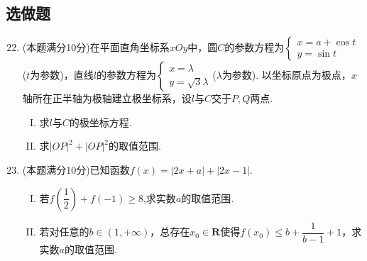 \documentclass[11pt]{article}
\begin{document}
\subsection{\heiti 选做题}
\begin{enumerate}
	\setcounter{enumi}{21}
	\item \heiti [选修4-4：极坐标与参数方程]\songti (本题满分10分)在平面直角坐标系$ xOy $中，圆$ C $的参数方程为$\left\{\begin{array}{l} x = a+\cos t
		\\ y = \sin t\end{array}\right.$($ t $为参数)，直线$ l $的参数方程为$ \left\{ \begin{array}{l}
		x=\lambda \\
		y=\sqrt{3} \lambda
	\end{array}\right. $($ \lambda $为参数). 以坐标原点为极点，$ x $轴所在正半轴为极轴建立极坐标系，设$ l $与$ C $交于$ P,Q $两点.
	\begin{enumerate}[(I)]
		\item 求$ l $与$ C $的极坐标方程.
		\item 求$ \left | OP \right | ^2+\left | OP \right | ^2 $的取值范围.
	\end{enumerate}
	\item \heiti [选修4-5：不等式选讲]\songti (本题满分10分)已知函数$ f(x)=\left | 2x+a \right | +\left | 2x-1 \right |  $.
	\begin{enumerate}[(I)]
		\item 若$ f\left ( \dfrac{1}{2}  \right ) +f(-1)\geqslant 8 $,求实数$ a $的取值范围.
		\item 若对任意的$ b \in \left ( 1,+\infty  \right )  $，总存在$ x_0\in \mathbf{R} $使得$ f(x_0)\leqslant b+\dfrac{1}{b-1}+ 1 $，求实数$ a $的取值范围.
		\end{enumerate}
\end{enumerate}
\end{document}
